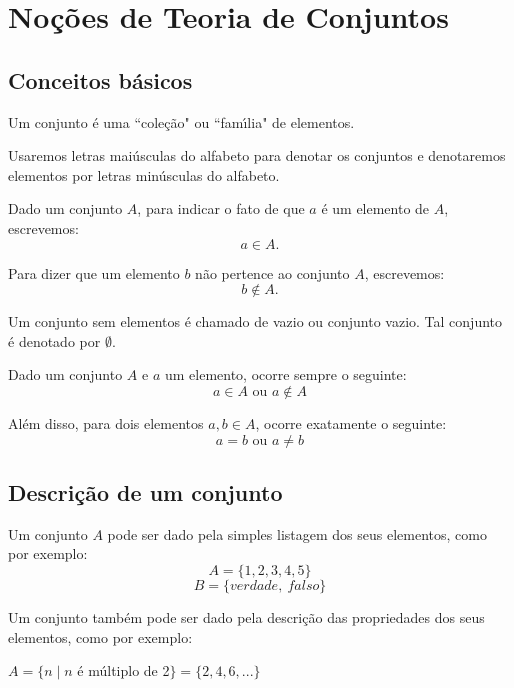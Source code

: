 \chapter{No{\c c}{\~o}es de Teoria de Conjuntos}
\section{Conceitos b{\'a}sicos}

Um conjunto {\'e} uma ``cole{\c c}{\~a}o" ou ``fam{\'\i}lia" de elementos.

Usaremos letras mai{\'u}sculas do alfabeto para denotar os conjuntos e denotaremos elementos por letras min{\'u}sculas do alfabeto.

Dado um conjunto $A$, para indicar o fato de que $a$ {\'e} um elemento de $A$, escrevemos:
\[
a \in A.
\]

Para dizer que um elemento $b$ n{\~a}o pertence ao conjunto $A$, escrevemos:
\[
b \notin A.
\]

Um conjunto sem elementos {\'e} chamado de vazio ou conjunto vazio. Tal conjunto {\'e} denotado por $\emptyset$.

Dado um conjunto $A$ e $a$ um elemento, ocorre sempre o seguinte:
\[a \in A \mbox{ ou } a \notin A\]

Al{\'e}m disso, para dois elementos $a,b\in A$, ocorre exatamente o seguinte:
\[a=b \mbox{ ou } a\neq b\]

\section{Descri{\c c}{\~a}o de um conjunto}

Um conjunto $A$ pode ser dado pela simples listagem dos seus elementos, como por exemplo:
\[ A= \{1,2,3,4,5\}\]
\[B = \{verdade,\ falso\}\]

Um conjunto tamb{\'e}m pode ser dado pela descri{\c c}{\~a}o das propriedades dos seus elementos, como por exemplo:

$A=\{n \mid n$ {\'e} m{\'u}ltiplo de 2$\}=\{2,4,6,...\}$

